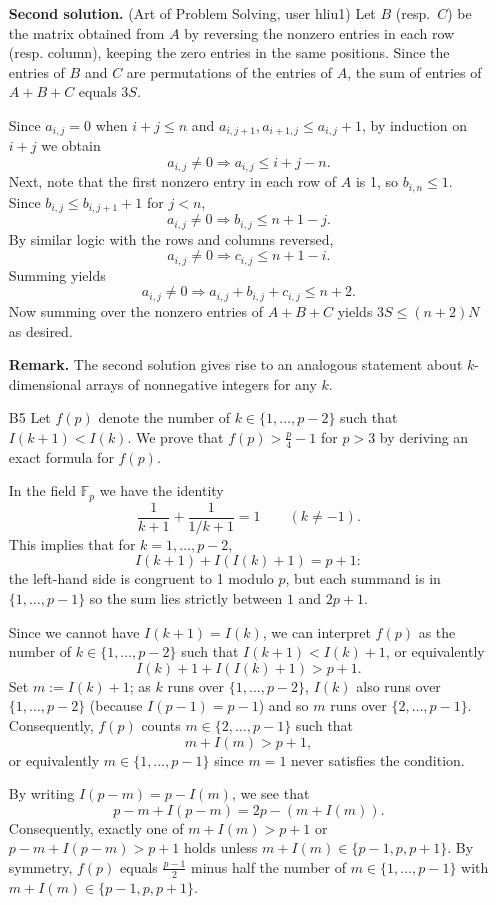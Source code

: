 \documentclass[amssymb,twocolumn,pra,10pt,aps]{revtex4-1}
\begin{document}
\begin{itemize}
\noindent
\textbf{Second solution.}
(Art of Problem Solving, user hliu1)
Let $B$ (resp.\ $C$)
be the matrix obtained from $A$ by reversing the nonzero entries in each row (resp. column),
keeping the zero entries in the same positions. Since the entries of $B$ and $C$ are permutations of the entries of $A$, the sum of entries of $A+B+C$ equals $3S$.

Since $a_{i,j} = 0$ when $i+j \leq n$
and $a_{i,j+1}, a_{i+1,j} \leq a_{i,j}+1$,
by induction on $i+j$ we obtain
\[
a_{i,j} \neq 0 \Longrightarrow a_{i,j} \leq i+j-n.
\]
Next, note that the first nonzero entry in each row of $A$ is 1, so $b_{i,n} \leq 1$.
Since $b_{i,j} \leq b_{i,j+1}+1$ for $j < n$,
\[
a_{i,j} \neq 0 \Longrightarrow b_{i,j} \leq n+1-j.
\]
By similar logic with the rows and columns reversed,
\[
a_{i,j} \neq 0 \Longrightarrow c_{i,j} \leq n + 1 - i.
\]
Summing yields
\[
a_{i,j} \neq 0 \Longrightarrow a_{i,j} + b_{i,j} + c_{i,j} \leq n+2.
\]
Now summing over the nonzero entries of $A+B+C$ yields $3S \leq (n+2) N$ as desired.

\noindent
\textbf{Remark.}
The second solution gives rise to an analogous statement about $k$-dimensional arrays of nonnegative integers for any $k$.

\item[B5]
Let $f(p)$ denote the number of $k \in \{1,\dots,p-2\}$ such that $I(k+1) < I(k)$.
We prove that $f(p) > \tfrac{p}{4}-1$ for $p > 3$ by deriving an exact formula for $f(p)$.

In the field $\mathbb{F}_p$ we have the identity
\[
\frac{1}{k+1} + \frac{1}{1/k + 1} = 1 \qquad (k \neq -1).
\]
This implies that for $k=1, \dots, p-2$,
\[
I(k+1) + I(I(k)+1) = p+1:
\]
the left-hand side is congruent to 1 modulo $p$, but each summand is in $\{1,\dots,p-1\}$
so the sum lies strictly between $1$ and $2p+1$.

Since we cannot have $I(k+1) = I(k)$, we can interpret $f(p)$ as the number of $k \in \{1,\dots,p-2\}$ such that $I(k+1) < I(k)+1$, or equivalently
\[
I(k)+1 + I(I(k)+1) > p+1.
\]
Set $m := I(k)+1$; as $k$ runs over $\{1,\dots,p-2\}$, $I(k)$ also runs over $\{1,\dots,p-2\}$
(because $I(p-1) = p-1$) and so $m$ runs over $\{2,\dots,p-1\}$. 
Consequently, $f(p)$ counts
$m \in \{2,\dots,p-1\}$ such that
\[
m + I(m) > p+1,
\]
or equivalently $m \in \{1,\dots,p-1\}$ since $m=1$ never satisfies the condition.

By writing $I(p-m) = p-I(m)$, we see that
\[
p-m + I(p-m) = 2p - (m + I(m)).
\]
Consequently, exactly one of $m+I(m) > p+1$ or $p-m+I(p-m) > p+1$ holds unless
$m+I(m) \in \{p-1, p, p+1\}$. By symmetry, $f(p)$ equals $\frac{p-1}{2}$ minus half the number of $m \in \{1,\dots,p-1\}$ with $m+I(m) \in \{p-1, p, p+1\}$.


\end{itemize}
\end{document}
